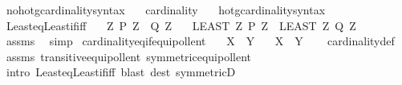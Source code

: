 \begin{isabellebody}
\isanewline
{}\isamarkupfalse%
\ no{\isacharunderscore}{\kern0pt}hotg{\isacharunderscore}{\kern0pt}cardinality{\isacharunderscore}{\kern0pt}syntax\ \ \isamarkupfalse%
\ cardinality\ {\isacharparenleft}{\kern0pt}{\isachardoublequoteopen}{\isacharbar}{\kern0pt}{\isacharunderscore}{\kern0pt}{\isacharbar}{\kern0pt}{\isachardoublequoteclose}{\isacharparenright}{\kern0pt}\ \isamarkupfalse%
\isanewline
{}\isamarkupfalse%
\ hotg{\isacharunderscore}{\kern0pt}cardinality{\isacharunderscore}{\kern0pt}syntax\isanewline
\isanewline
{}\isamarkupfalse%
\ Least{\isacharunderscore}{\kern0pt}eq{\isacharunderscore}{\kern0pt}Least{\isacharunderscore}{\kern0pt}if{\isacharunderscore}{\kern0pt}iff{\isacharcolon}{\kern0pt}\isanewline
\ \ \ {\isachardoublequoteopen}{\isasymAnd}Z{\isachardot}{\kern0pt}\ P\ Z\ {\isasymlongleftrightarrow}\ Q\ Z{\isachardoublequoteclose}\isanewline
\ \ \ {\isachardoublequoteopen}{\isacharparenleft}{\kern0pt}LEAST\ Z{\isachardot}{\kern0pt}\ P\ Z{\isacharparenright}{\kern0pt}\ {\isacharequal}{\kern0pt}\ {\isacharparenleft}{\kern0pt}LEAST\ Z{\isachardot}{\kern0pt}\ Q\ Z{\isacharparenright}{\kern0pt}{\isachardoublequoteclose}\isanewline
%
\isadelimproof
\ \ %
\endisadelimproof
%
\isatagproof
{}\isamarkupfalse%
\ assms\ \isamarkupfalse%
\ simp%
\endisatagproof
{\isafoldproof}%
%
\isadelimproof
\isanewline
%
\endisadelimproof
\isanewline
{}\isamarkupfalse%
\ cardinality{\isacharunderscore}{\kern0pt}eq{\isacharunderscore}{\kern0pt}if{\isacharunderscore}{\kern0pt}equipollent{\isacharcolon}{\kern0pt}\isanewline
\ \ \ {\isachardoublequoteopen}X\ {\isasymapprox}\ Y{\isachardoublequoteclose}\isanewline
\ \ \ {\isachardoublequoteopen}{\isacharbar}{\kern0pt}X{\isacharbar}{\kern0pt}\ {\isacharequal}{\kern0pt}\ {\isacharbar}{\kern0pt}Y{\isacharbar}{\kern0pt}{\isachardoublequoteclose}\isanewline
%
\isadelimproof
\ \ %
\endisadelimproof
%
\isatagproof
{}\isamarkupfalse%
\ cardinality{\isacharunderscore}{\kern0pt}def\ \isamarkupfalse%
\ assms\ transitive{\isacharunderscore}{\kern0pt}equipollent\ symmetric{\isacharunderscore}{\kern0pt}equipollent\isanewline
\ \ \isamarkupfalse%
\ {\isacharparenleft}{\kern0pt}intro\ Least{\isacharunderscore}{\kern0pt}eq{\isacharunderscore}{\kern0pt}Least{\isacharunderscore}{\kern0pt}if{\isacharunderscore}{\kern0pt}iff{\isacharparenright}{\kern0pt}\ {\isacharparenleft}{\kern0pt}blast\ dest{\isacharcolon}{\kern0pt}\ symmetricD{\isacharparenright}{\kern0pt}%

\end{isabellebody}
